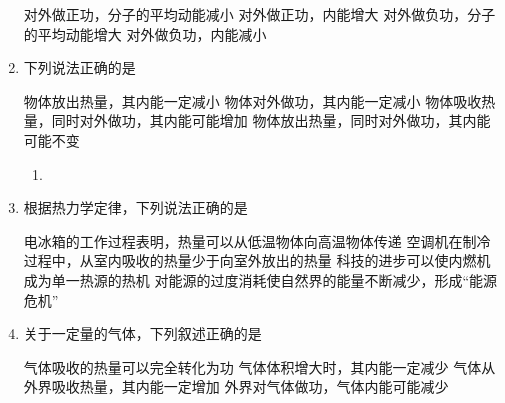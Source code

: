 \begin{enumerate}[leftmargin=0em]
\fourchoices
{对外做正功，分子的平均动能减小}
{对外做正功，内能增大}
{对外做负功，分子的平均动能增大}
{对外做负功，内能减小}

\item 
{}
下列说法正确的是  

\fourchoices
{物体放出热量，其内能一定减小}
{物体对外做功，其内能一定减小}
{物体吸收热量，同时对外做功，其内能可能增加}
{物体放出热量，同时对外做功，其内能可能不变}

\begin{enumerate}[leftmargin=-2em]
\renewcommand{\labelenumii}{}
\item
{}
\end{enumerate}


\item 
{}
根据热力学定律，下列说法正确的是  

\fourchoices
{电冰箱的工作过程表明，热量可以从低温物体向高温物体传递}
{空调机在制冷过程中，从室内吸收的热量少于向室外放出的热量}
{科技的进步可以使内燃机成为单一热源的热机}
{对能源的过度消耗使自然界的能量不断减少，形成“能源危机”}


\item
{}
关于一定量的气体，下列叙述正确的是  


\fourchoices
{气体吸收的热量可以完全转化为功 }
{气体体积增大时，其内能一定减少}
{气体从外界吸收热量，其内能一定增加}
{外界对气体做功，气体内能可能减少}







\end{enumerate}

